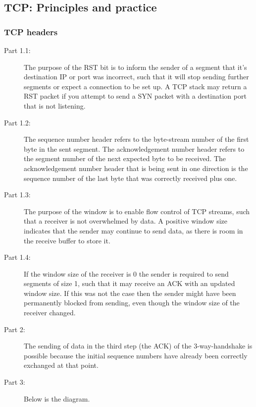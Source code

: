 \subsection{TCP: Principles and practice}
\subsubsection{TCP headers}
\begin{description}
    \item[Part 1.1:] The purpose of the RST bit is to inform the sender of a segment that it's destination IP or port was
        incorrect, such that it will stop sending further segments or expect a connection to be set up. A TCP stack may return
        a RST packet if you attempt to send a SYN packet with a destination port that is not listening.
    \item[Part 1.2:] The sequence number header refers to the byte-stream number of the first byte in the sent segment. The
        acknowledgement number header refers to the segment number of the next expected byte to be received. The acknowledgement
        number header that is being sent in one direction is the sequence number of the last byte that was correctly received
        plus one. %
    \item[Part 1.3:] The purpose of the window is to enable flow control of TCP streams, such that a receiver is not overwhelmed
        by data. A positive window size indicates that the sender may continue to send data, as there is room in the receive buffer
        to store it.
    \item[Part 1.4:] If the window size of the receiver is 0 the sender is required to send segments of size 1, such
        that it may receive an ACK with an updated window size. If this was not the case then the sender might have been
        permanently blocked from sending, even though the window size of the receiver changed.
    \item[Part 2:] The sending of data in the third step (the ACK) of the 3-way-handshake is possible because the initial
        sequence numbers have already been correctly exchanged at that point. %
    \item[Part 3:] Below is the diagram.
        \begin{figure}[!h]
        \centering

\end{figure}
\end{description}
